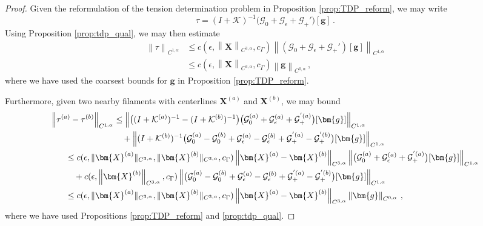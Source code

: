 \documentclass[11pt,reqno]{amsart}
\newcommand{\X}{\bm{X}}
\newcommand{\norm}[1]{\left\lVert #1 \right\rVert}
\newcommand{\mc}[1]{\mathcal{#1}}
\theoremstyle{definition}
\begin{document}
\begin{proof}
Given the reformulation of the tension determination problem in Proposition \ref{prop:TDP_reform}, we may write 
\begin{equation}
  \tau = (I+\mc{K})^{-1}\big(\mc{G}_0+ \mc{G}_\epsilon + \mc{G}_+'\big)[\bm{g}] \,.
\end{equation}
%
Using Proposition \ref{prop:tdp_qual}, we may then estimate
\begin{equation}
\begin{aligned}
  \norm{\tau}_{C^{1,\alpha}}&\le c(\epsilon,\norm{\X}_{C^{3,\alpha}},c_\Gamma)\norm{(\mc{G}_0+ \mc{G}_\epsilon + \mc{G}_+')[\bm{g}]}_{C^{1,\alpha}}\\
  &\le c(\epsilon,\norm{\X}_{C^{3,\alpha}},c_\Gamma)\norm{\bm{g}}_{C^{0,\alpha}}\,,
\end{aligned}
\end{equation}
where we have used the coarsest bounds for $\bm{g}$ in Proposition \ref{prop:TDP_reform}. 


Furthermore, given two nearby filaments with centerlines $\X^{(a)}$ and $\X^{(b)}$, we may bound
\begin{equation}
\begin{aligned}
  \norm{\tau^{(a)}-\tau^{(b)}}_{C^{1,\alpha}} &\le 
  \norm{ \big((I+\mc{K}^{(a)})^{-1}-(I+\mc{K}^{(b)})^{-1}\big)\big(\mc{G}_0^{(a)}+ \mc{G}_\epsilon^{(a)} + \mc{G}_+^{'(a)}\big)[\bm{g}] }_{C^{1,\alpha}}\\
  &\quad + \norm{ (I+\mc{K}^{(b)})^{-1}\big(\mc{G}_0^{(a)}-\mc{G}_0^{(b)}+ \mc{G}_\epsilon^{(a)}-\mc{G}_\epsilon^{(b)} + \mc{G}_+^{'(a)}-\mc{G}_+^{'(b)}\big)[\bm{g}] }_{C^{1,\alpha}}\\
  &\hspace{-2cm}\le c(\epsilon,\|\X^{(a)}\|_{C^{3,\alpha}},\|\X^{(b)}\|_{C^{3,\alpha}},c_\Gamma)\norm{\X^{(a)}-\X^{(b)}}_{C^{3,\alpha}}\norm{\big(\mc{G}_0^{(a)}+ \mc{G}_\epsilon^{(a)} + \mc{G}_+^{'(a)}\big)[\bm{g}] }_{C^{1,\alpha}}\\
  &\hspace{-2cm}\quad + c(\epsilon,\norm{\X^{(b)}}_{C^{3,\alpha}},c_\Gamma)\norm{\big(\mc{G}_0^{(a)}-\mc{G}_0^{(b)}+ \mc{G}_\epsilon^{(a)}-\mc{G}_\epsilon^{(b)} + \mc{G}_+^{'(a)}-\mc{G}_+^{'(b)}\big)[\bm{g}] }_{C^{1,\alpha}}\\
  &\hspace{-2cm}\le c(\epsilon,\|\X^{(a)}\|_{C^{3,\alpha}},\|\X^{(b)}\|_{C^{3,\alpha}},c_\Gamma)\norm{\X^{(a)}-\X^{(b)}}_{C^{3,\alpha}}\norm{\bm{g}}_{C^{0,\alpha}}\,,
\end{aligned}
\end{equation}
where we have used Propositions \ref{prop:TDP_reform} and \ref{prop:tdp_qual}.
%
%
%
\end{proof}
\end{document}
